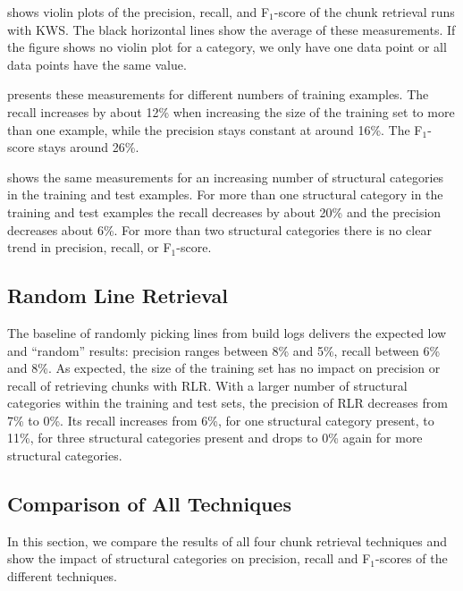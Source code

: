 shows violin plots
of the precision,
recall, and F$_{1}$-score of the chunk retrieval runs with KWS.
The black horizontal lines show the average of these measurements.
If the figure shows no violin plot for a category, we only have one
data point or all data points have the same value.

 presents these
measurements for different
numbers of training examples.
The recall increases by about 12\% when
increasing the size of the training set to more than one example,
while the precision stays constant at around 16\%.
The F$_{1}$-score
stays around 26\%.

 shows the same
measurements for an increasing number of structural categories in the
training and test examples.
For more than one structural category in
the training and test examples the recall decreases by about 20\% and
the precision decreases about 6\%.
For more than two structural
categories there is no clear trend in precision, recall, or
F$_{1}$-score.

\subsection{Random Line Retrieval}
\label{sec:r:rlr}

The baseline of randomly
picking lines from build logs delivers the expected low and
``random'' results: precision ranges between 8\% and 5\%,
recall between 6\% and 8\%.
As expected, the size of the training set has no impact on precision
or recall of retrieving chunks with RLR.
With a larger number of structural categories within the training and
test sets, the precision of RLR decreases from 7\% to 0\%.
Its recall
increases from 6\%, for one structural category present, to 11\%, for
three structural categories present and drops to 0\% again for more
structural categories.

\subsection{Comparison of All Techniques}
In this section, we compare the results of all four chunk retrieval
techniques and show the impact of structural categories on precision,
recall and F$_{1}$-scores of the different techniques.

